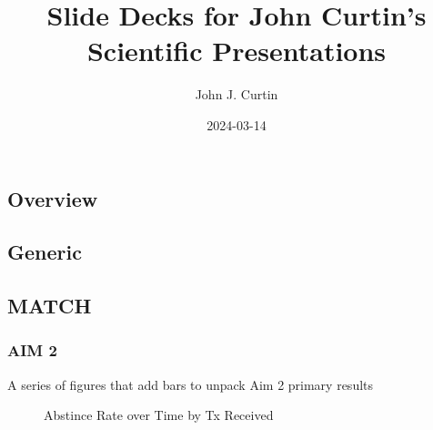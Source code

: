 \documentclass[
  letterpaper,
  DIV=11,
  numbers=noendperiod]{scrartcl}
\title{Slide Decks for John Curtin's Scientific Presentations}
\author{John J. Curtin}
\date{2024-03-14}
\begin{document}
\maketitle

\subsection{Overview}\label{overview}

\subsection{Generic}\label{generic}

\subsection{MATCH}\label{match}

\subsubsection{AIM 2}\label{aim-2}

A series of figures that add bars to unpack Aim 2 primary results

\begin{figure}[H]


\caption{\label{fig-tx_week_1}Abstince Rate over Time by Tx Received}

\end{figure}%
\end{document}
